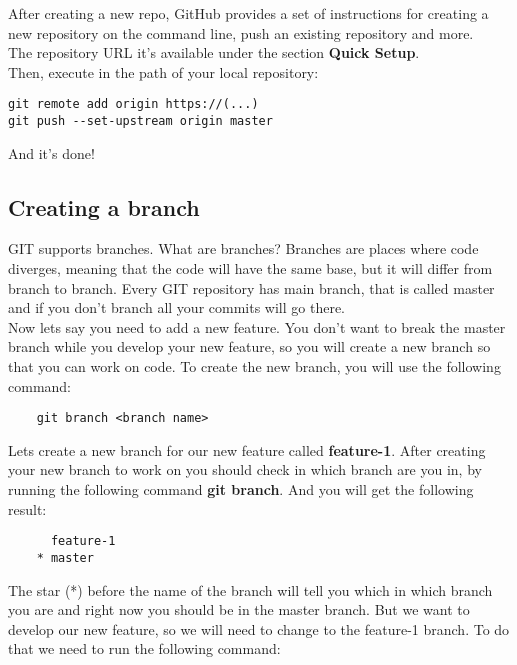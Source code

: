 \documentclass{article}
\begin{document}
After creating a new repo, GitHub provides a set of instructions for creating a new repository on the command line, push an existing repository and more.\\

The repository URL it's available under the section \textbf{Quick Setup}.\\

Then, execute in the path of your local repository:

\begin{lstlisting}
git remote add origin https://(...)
git push --set-upstream origin master
\end{lstlisting}

And it's done!

\subsection{Creating a branch}

GIT supports branches. What are branches? Branches are places where code diverges, meaning that the code will have the same base, but it will differ from branch to branch. Every GIT repository has main branch, that is called master and if you don't branch all your commits will go there.\\

Now lets say you need to add a new feature. You don't want to break the master branch while you develop your new feature, so you will create a new branch so that you can work on code. To create the new branch, you will use the following command:

\begin{lstlisting}
	git branch <branch name>
\end{lstlisting}

Lets create a new branch for our new feature called \textbf{feature-1}. After creating your new branch to work on you should check in which branch are you in, by running the following command \textbf{git branch}. And you will get the following result:

\begin{lstlisting}
	  feature-1
	* master
\end{lstlisting}

The star (*) before the name of the branch will tell you which in which branch you are and right now you should be in the master branch. But we want to develop our new feature, so we will need to change to the feature-1 branch. To do that we need to run the following command:
\end{document}
